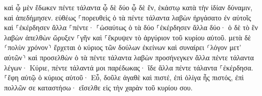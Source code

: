 \documentclass{openreader}
\begin{document}
καὶ ᾧ μὲν ἔδωκεν πέντε τάλαντα ᾧ δὲ δύο ᾧ δὲ ἕν, ἑκάστῳ κατὰ τὴν ἰδίαν δύναμιν, καὶ ἀπεδήμησεν. εὐθέως 
⸀πορευθεὶς ὁ τὰ πέντε τάλαντα λαβὼν ἠργάσατο ἐν αὐτοῖς καὶ ⸀ἐκέρδησεν ἄλλα ⸀πέντε· 
⸀ὡσαύτως ὁ τὰ δύο ⸀ἐκέρδησεν ἄλλα δύο· 
ὁ δὲ τὸ ἓν λαβὼν ἀπελθὼν ὤρυξεν ⸀γῆν καὶ ⸀ἔκρυψεν τὸ ἀργύριον τοῦ κυρίου αὐτοῦ. 
μετὰ δὲ ⸂πολὺν χρόνον⸃ ἔρχεται ὁ κύριος τῶν δούλων ἐκείνων καὶ συναίρει ⸂λόγον μετ’ αὐτῶν⸃ 
καὶ προσελθὼν ὁ τὰ πέντε τάλαντα λαβὼν προσήνεγκεν ἄλλα πέντε τάλαντα λέγων· Κύριε, πέντε τάλαντά μοι παρέδωκας· ἴδε ἄλλα πέντε τάλαντα ⸀ἐκέρδησα. 
⸀ἔφη αὐτῷ ὁ κύριος αὐτοῦ· Εὖ, δοῦλε ἀγαθὲ καὶ πιστέ, ἐπὶ ὀλίγα ἦς πιστός, ἐπὶ πολλῶν σε καταστήσω· εἴσελθε εἰς τὴν χαρὰν τοῦ κυρίου σου. 
\end{document}
